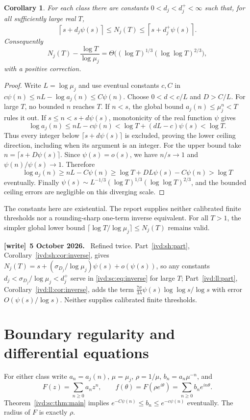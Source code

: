 \documentclass[11pt,letterpaper]{article}
\newtheorem{corollary}[theorem]{Corollary}
\theoremstyle{remark}\newtheorem{remark}[theorem]{Remark}
\numberwithin{equation}{section}
\newenvironment{writenote}[1][]{\par\smallskip\begingroup\small
 \noindent\textbf{[write]}\if\relax\detokenize{#1}\relax\else~\textbf{#1.}\fi\ }%
 {\par\endgroup\smallskip}
\begin{document}
\begin{corollary}\label{ivd:sc:cor:inverse}
For each class there are constants $0<d_j<d_j^+<\infty$ such that, for
all sufficiently large real $T$,
\begin{equation}\label{ivd:sc:eq:inverse}
 \left\lceil s+d_j\psi(s)\right\rceil\le N_j(T)
 \le\left\lceil s+d_j^+\psi(s)\right\rceil.
\end{equation}
Consequently
\[
 N_j(T)-\frac{\log T}{\log\mu_j}
 =\Theta\big((\log T)^{1/3}(\log\log T)^{2/3}\big),
\]
with a positive correction.
\end{corollary}
\begin{proof}
Write $L=\log\mu_j$ and use eventual constants $c,C$ in
$c\psi(n)\le nL-\log a_j(n)\le C\psi(n)$.
Choose $0<d<c/L$ and $D>C/L$. For large $T$, no bounded $n$
reaches $T$. If $n<s$, the global bound $a_j(n)\le\mu_j^n<T$
rules it out. If $s\le n<s+d\psi(s)$, monotonicity of the real
function $\psi$ gives
\[
 \log a_j(n)\le nL-c\psi(n)
 <\log T+(dL-c)\psi(s)<\log T.
\]
Thus every integer below $\lceil s+d\psi(s)\rceil$ is excluded,
proving the lower ceiling direction, including when its argument is an
integer. For the upper bound take $n=\lceil s+D\psi(s)\rceil$.
Since $\psi(s)=o(s)$, we have $n/s\to1$ and
$\psi(n)/\psi(s)\to1$. Therefore
\[
 \log a_j(n)\ge nL-C\psi(n)
 \ge\log T+DL\psi(s)-C\psi(n)>\log T
\]
eventually. Finally
$\psi(s)\sim L^{-1/3}(\log T)^{1/3}(\log\log T)^{2/3}$,
and the bounded ceiling errors are negligible on this diverging scale.
\end{proof}
The constants here are existential. The report supplies neither calibrated
finite thresholds nor a rounding-sharp one-term inverse equivalent.
For all $T>1$, the simpler global lower bound
$\lceil\log T/\log\mu_j\rceil\le N_j(T)$ remains valid.
\begin{writenote}[5 October 2026]
Refined twice. Part~\ref{ivd:sh:part}, Corollary~\ref{ivd:sh:cor:inverse}, gives $N_j(T)=s+(\sigma_{D_j}/\log\mu_j)\psi(s)+o(\psi(s))$, so any constants $d_j<\sigma_{D_j}/\log\mu_j<d_j^+$ serve in \eqref{ivd:sc:eq:inverse} for large $T$; Part~\ref{ivd:ll:part}, Corollary~\ref{ivd:ll:cor:inverse}, adds the term $\frac{7\sigma}{3\lambda}\psi(s)\log\log s/\log s$ with error $O(\psi(s)/\log s)$. Neither supplies calibrated finite thresholds.
\end{writenote}

\section{Boundary regularity and differential equations}\label{ivd:sc:sec:analytic}
For either class write $a_n=a_j(n)$, $\mu=\mu_j$, $\rho=1/\mu$,
$b_n=a_n\mu^{-n}$, and
\[
 F(z)=\sum_{n\ge0}a_nz^n,\qquad
 f(\theta)=F(\rho e^{i\theta})=\sum_{n\ge0}b_ne^{in\theta}.
\]
Theorem~\ref{ivd:sc:thm:main} implies $e^{-C\psi(n)}\le b_n\le
e^{-c\psi(n)}$ eventually. The radius of $F$ is exactly $\rho$.
\end{document}
